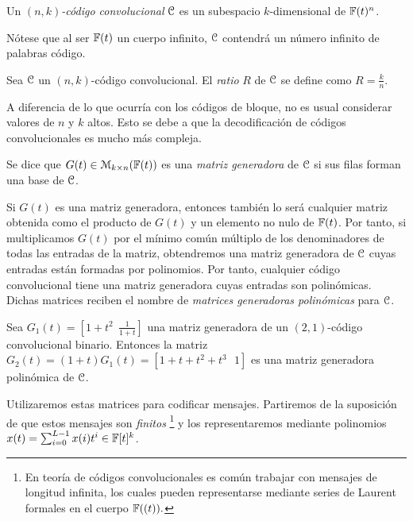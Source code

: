 \begin{definicion}
    Un \emph{$(n,k)$-código convolucional} $\mathcal C$ es un subespacio $k$-dimensional de $\mathbb{F}(t)^n$.
\end{definicion}

Nótese que al ser $\mathbb{F}(t)$ un cuerpo infinito, $\mathcal C$ contendrá un número infinito de palabras código.

\begin{definicion}
    Sea $\mathcal C$ un $(n,k)$-código convolucional. El \emph{ratio} $R$ de $\mathcal C$ se define como $R = \frac{k}{n}$.
\end{definicion}

A diferencia de lo que ocurría con los códigos de bloque, no es usual considerar valores de $n$ y $k$ altos. Esto se debe a que la decodificación de códigos convolucionales es mucho más compleja.

\begin{definicion}
    Se dice que $G(t) \in \mathcal{M}_{k \times n}(\mathbb{F}(t))$ es una \emph{matriz generadora} de $\mathcal C$ si sus filas forman una base de $\mathcal C$.
\end{definicion}

Si $G(t)$ es una matriz generadora, entonces también lo será cualquier matriz obtenida como el producto de $G(t)$ y un elemento no nulo de $\mathbb{F}(t)$. Por tanto, si multiplicamos $G(t)$ por el mínimo común múltiplo de los denominadores de todas las entradas de la matriz, obtendremos una matriz generadora de $\mathcal C$ cuyas entradas están formadas por polinomios. Por tanto, cualquier código convolucional tiene una matriz generadora cuyas entradas son polinómicas. Dichas matrices reciben el nombre de \emph{matrices generadoras polinómicas} para $\mathcal C$.

\begin{ejemplo}
Sea $G_1(t) = \left[1 + t^2 \ \ \frac{1}{1 + t}\right]$ una matriz generadora de un $(2,1)$-código convolucional binario. Entonces la matriz $G_2(t) = (1+t)G_1(t) = \left[1 + t + t^2 + t^3 \ \ \ 1  \right]$ es una matriz generadora polinómica de $\mathcal C$.
\end{ejemplo}


Utilizaremos estas matrices para codificar mensajes. Partiremos de la suposición de que estos mensajes son \emph{finitos} \footnote{En teoría de códigos convolucionales es común trabajar con mensajes de longitud infinita, los cuales pueden representarse mediante series de Laurent formales en el cuerpo $\mathbb{F}((t)).$} y los representaremos mediante polinomios $x(t) = \sum_{i=0}^{L-1} x(i)t^i \in \mathbb{F}[t]^k$.

